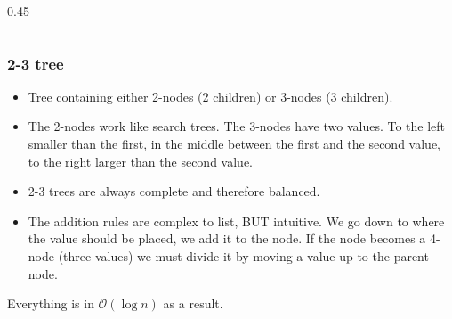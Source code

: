 \documentclass[8pt,aspectratio=169]{beamer}
\begin{document}
\begin{frame}[fragile]
\begin{columns}[T]
\begin{column}{0.45\textwidth}
\vspace{0.2cm}

\end{column}

\end{columns}
\end{frame}

\begin{frame}
\frametitle{2-3 tree}
\begin{itemize}
	\item Tree containing either 2-nodes (2 children) or 3-nodes (3 children).
	\item The 2-nodes work like search trees. The 3-nodes have two values. To the left smaller than the first, in the middle between the first and the second value, to the right larger than the second value.
	\item 2-3 trees are always complete and therefore balanced.
	\item The addition rules are complex to list, BUT intuitive. We go down to where the value should be placed, we add it to the node. If the node becomes a 4-node (three values) we must divide it by moving a value up to the parent node.
\end{itemize}
Everything is in $\mathcal{O}(\log n)$ as a result.
\end{frame}
\end{document}
